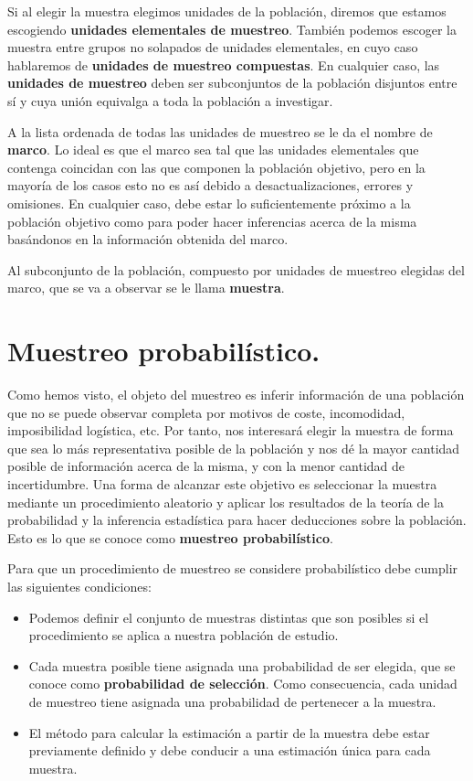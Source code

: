 Si al elegir la muestra elegimos unidades de la poblaci\'on, diremos que estamos escogiendo \textbf{unidades elementales de muestreo}. Tambi\'en podemos escoger la muestra entre grupos no solapados de unidades elementales, en cuyo caso hablaremos de \textbf{unidades de muestreo compuestas}. En cualquier caso, las\textbf{ unidades de muestreo} deben ser subconjuntos de la poblaci\'on disjuntos entre s\'i y cuya uni\'on equivalga a toda la poblaci\'on a investigar.

A la lista ordenada de todas las unidades de muestreo se le da el nombre de \textbf{marco}. Lo ideal es que el marco sea tal que las unidades elementales que contenga coincidan con las que componen la poblaci\'on objetivo, pero en la mayor\'ia de los casos esto no es as\'i debido a desactualizaciones, errores y omisiones. En cualquier caso, debe estar lo suficientemente pr\'oximo a la poblaci\'on objetivo como para poder hacer inferencias acerca de la misma bas\'andonos en la informaci\'on obtenida del marco.

Al subconjunto de la poblaci\'on, compuesto por unidades de muestreo elegidas del marco, que se va a observar se le llama \textbf{muestra}.

\section{Muestreo probabil\'istico.}

Como hemos visto, el objeto del muestreo es inferir informaci\'on de una poblaci\'on que no se puede observar completa por motivos de coste, incomodidad, imposibilidad log\'istica, etc. Por tanto, nos interesar\'a elegir la muestra de forma que sea lo m\'as representativa posible de la poblaci\'on y nos d\'e la mayor cantidad posible de informaci\'on acerca de la misma, y con la menor cantidad de incertidumbre. Una forma de alcanzar este objetivo es seleccionar la muestra mediante un procedimiento aleatorio y aplicar los resultados de la teor\'ia de la probabilidad y la inferencia estad\'istica para hacer deducciones sobre la poblaci\'on. Esto es lo que se conoce como \textbf{muestreo probabil\'istico}.

Para que un procedimiento de muestreo se considere probabil\'istico debe cumplir las siguientes condiciones:

\begin{itemize}
	\item Podemos definir el conjunto de muestras distintas que son posibles si el procedimiento se aplica a nuestra poblaci\'on de estudio.
	\item Cada muestra posible tiene asignada una probabilidad de ser elegida, que se conoce como \textbf{probabilidad de selecci\'on}. Como consecuencia, cada unidad de muestreo tiene asignada una probabilidad de pertenecer a la muestra.
	\item El m\'etodo para calcular la estimaci\'on a partir de la muestra debe estar previamente definido y debe conducir a una estimaci\'on \'unica para cada muestra.
\end{itemize}

